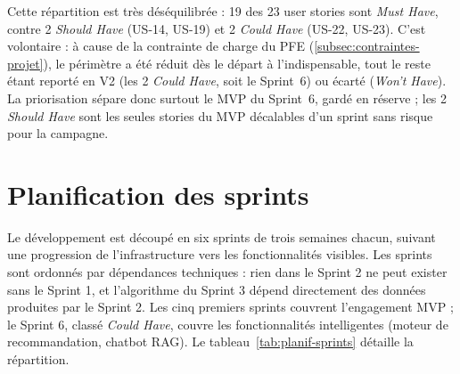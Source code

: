 Cette répartition est très déséquilibrée : 19 des 23 user stories sont \textit{Must Have}, contre 2 \textit{Should Have} (US-14, US-19) et 2 \textit{Could Have} (US-22, US-23). C'est volontaire : à cause de la contrainte de charge du PFE (\ref{subsec:contraintes-projet}), le périmètre a été réduit dès le départ à l'indispensable, tout le reste étant reporté en V2 (les 2 \textit{Could Have}, soit le Sprint~6) ou écarté (\textit{Won't Have}). La priorisation sépare donc surtout le MVP du Sprint~6, gardé en réserve ; les 2 \textit{Should Have} sont les seules stories du MVP décalables d'un sprint sans risque pour la campagne.

\section{Planification des sprints}

Le développement est découpé en six sprints de trois semaines chacun, suivant une progression de l'infrastructure vers les fonctionnalités visibles. Les sprints sont ordonnés par dépendances techniques : rien dans le Sprint 2 ne peut exister sans le Sprint 1, et l'algorithme du Sprint 3 dépend directement des données produites par le Sprint 2. Les cinq premiers sprints couvrent l'engagement MVP ; le Sprint 6, classé \textit{Could Have}, couvre les fonctionnalités intelligentes (moteur de recommandation, chatbot RAG). Le tableau~\ref{tab:planif-sprints} détaille la répartition.

